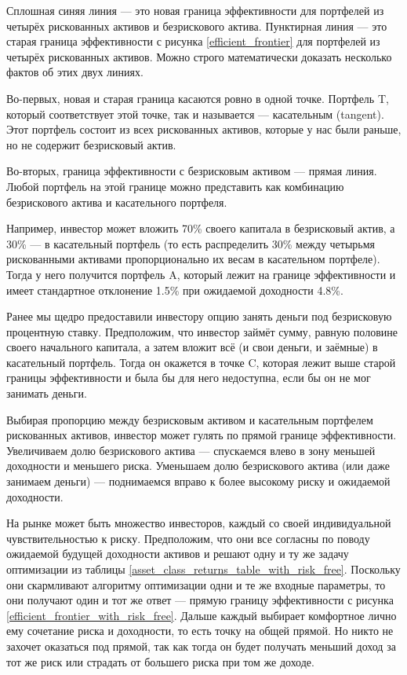 Сплошная синяя линия --- это новая граница эффективности для портфелей из 
четырёх рискованных активов и безрискового актива. Пунктирная линия --- это 
старая граница эффективности с рисунка \ref{efficient_frontier} для портфелей из 
четырёх рискованных активов. Можно строго математически доказать несколько 
фактов об этих двух линиях.

Во-первых, новая и старая граница касаются ровно в одной точке. Портфель T, 
который соответствует этой точке, так и называется --- касательным (tangent). 
Этот портфель состоит из всех рискованных активов, которые у нас были раньше, но 
не содержит безрисковый актив.

Во-вторых, граница эффективности с безрисковым активом --- прямая линия. Любой 
портфель на этой границе можно представить как комбинацию безрискового актива и 
касательного портфеля.

Например, инвестор может вложить 70\% своего капитала в безрисковый актив, а 
30\% --- в касательный портфель (то есть распределить 30\% между четырьмя 
рискованными активами пропорционально их весам в касательном портфеле). Тогда у 
него получится портфель A, который лежит на границе эффективности и имеет 
стандартное отклонение 1.5\% при ожидаемой доходности 4.8\%.

Ранее мы щедро предоставили инвестору опцию занять деньги под безрисковую 
процентную ставку. Предположим, что инвестор займёт сумму, равную половине 
своего начального капитала, а затем вложит всё (и свои деньги, и заёмные) в 
касательный портфель. Тогда он окажется в точке C, которая лежит выше старой 
границы эффективности и была бы для него недоступна, если бы он не мог занимать 
деньги.

Выбирая пропорцию между безрисковым активом и касательным портфелем рискованных 
активов, инвестор может гулять по прямой границе эффективности. Увеличиваем долю 
безрискового актива --- спускаемся влево в зону меньшей доходности и меньшего 
риска. Уменьшаем долю безрискового актива (или даже занимаем деньги) --- 
поднимаемся вправо к более высокому риску и ожидаемой доходности. 

На рынке может быть множество инвесторов, каждый со своей индивидуальной 
чувствительностью к риску. Предположим, что они все согласны по поводу ожидаемой
будущей доходности активов и решают одну и ту же задачу оптимизации из таблицы 
\ref{asset_class_returns_table_with_risk_free}. Поскольку они скармливают 
алгоритму оптимизации одни и те же входные параметры, то они получают один и тот 
же ответ --- прямую границу эффективности с рисунка 
\ref{efficient_frontier_with_risk_free}. Дальше каждый выбирает комфортное лично 
ему сочетание риска и доходности, то есть точку на общей прямой. Но никто не 
захочет оказаться под прямой, так как тогда он будет получать меньший доход за 
тот же риск или страдать от большего риска при том же доходе.

